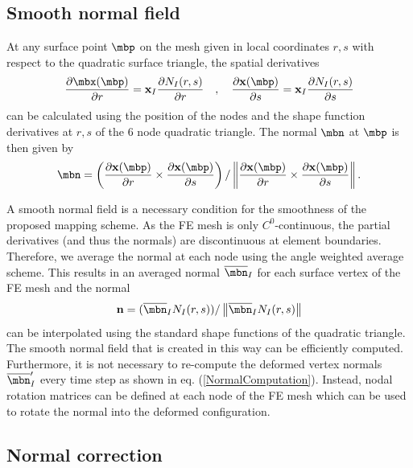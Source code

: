 \subsection{Smooth normal field}

At any surface point $\mbp$ on the mesh given in local coordinates $r, s$ with respect to the quadratic surface triangle, the spatial derivatives 
\begin{equation}
\frac{\partial \mbx (\mbp)}{\partial r} = \mathbf x_I \frac{\partial N_I (r,s)}{\partial r} \quad , \quad \frac{\partial \mathbf x (\mbp)}{\partial s} = \mathbf x_I \frac{\partial N_I (r,s)}{\partial s}
\end{equation}
can be calculated using the position of the nodes and the shape function derivatives at $r, s$ of the 6 node quadratic triangle. The normal $\mbn$ at $\mbp$ is then given by
\begin{equation}
\mbn  = \left( \frac{\partial \mathbf x (\mbp)}{\partial r} \times \frac{\partial \mathbf x (\mbp)}{\partial s} \right)/  \left\| \frac{\partial \mathbf x (\mbp)}{\partial r} \times \frac{\partial \mathbf x (\mbp)}{\partial s}  \right\|.
\label{NormalComputation}
\end{equation}

A smooth normal field is a necessary condition for the smoothness of the proposed mapping scheme. As the FE mesh is only $C^0$-continuous, the partial derivatives (and thus the normals) are discontinuous at element boundaries. Therefore, we average the normal at each node using the angle weighted average scheme. This results in an averaged normal $\overline{\mbn}_I$ for each surface vertex of the FE mesh and the normal 
\begin{equation}
\mathbf n  = ( \overline{\mbn}_I N_I(r, s) ) / \left\| \overline{\mbn}_I N_I(r, s) \right\|
\end{equation}
can be interpolated using the standard shape functions of the quadratic triangle. The smooth normal field that is created in this way can be efficiently computed. Furthermore, it is not necessary to re-compute the deformed vertex normals $\overline{\mbn}_I '$ every time step as shown in eq. (\ref{NormalComputation}). Instead, nodal rotation matrices can be defined at each node of the FE mesh which can be used to rotate the normal into the deformed configuration.


\subsection{Normal correction}

